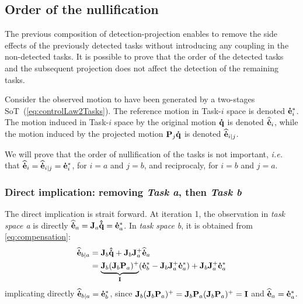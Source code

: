 \documentclass[letterpaper, 10pt, conference]{ieeeconf}      %
\begin{document}
%
%

\subsection{Order of the nullification}

The previous composition of detection-projection enables to remove the side effects of the previously detected tasks without introducing any coupling in the non-detected tasks. It is possible to prove that the order of the detected tasks and the subsequent projection does not affect the detection of the remaining tasks.

Consider the observed motion to have been generated by a two-stages
SoT~(\ref{eq:controlLaw2Tasks}). The reference motion in Task-$i$
space is denoted ${\mathbf{\dot{e}}}_{i}^*$. The motion induced in Task-$i$ space by the
original motion ${\mathbf{\dot{q}}}$ is denoted ${\mathbf{\widehat{\dot{e}}}}_{i}$, while the motion induced by
the projected motion ${\mathbf{P}}_{j} {\mathbf{\dot{q}}}$ is denoted ${\mathbf{\widehat{\dot{e}}}}_{i|j}$.

We will prove that the order of nullification of the tasks is not important,
\textit{i.e.} that ${\mathbf{\widehat{\dot{e}}}}_{i} = {\mathbf{\widehat{\dot{e}}}}_{i|j} = {\mathbf{\dot{e}}}_{i}^*$, for $i=a$ and $j=b$, and reciprocaly, for $i=b$ and $j=a$.

\subsubsection{Direct implication: removing \emph{Task a}, then \emph{Task b}}

The direct implication is strait forward.
%
At iteration 1, the observation in \emph{task space a} is directly
${\mathbf{\widehat{\dot{e}}}}_{a} = {\mathbf{J}}_a{\mathbf{\hat{\dot{q}}}} = {\mathbf{\dot{e}}}_{a}^*$.  In \emph{task space
  b}, it is obtained from \eqref{eq:compensation}:
\begin{align*}
 {\mathbf{\widehat{\dot{e}}}}_{b|a} &=  {\mathbf{J}}_b{\mathbf{\hat{\dot{q}}}} +  {\mathbf{J}}_b {\mathbf{J}}_a^+ {\mathbf{\widehat{\dot{e}}}}_{a}\\
 &= \underbrace{{\mathbf{J}}_b({\mathbf{J}}_b {\mathbf{P}}_a)^+}_{{\mathbf{I}}} ({\mathbf{\dot{e}}}_{b}^* - {\mathbf{J}}_b {\mathbf{J}}_a^+{\mathbf{\dot{e}}}_{a}^*) + {\mathbf{J}}_b {\mathbf{J}}_a^+ {\mathbf{\dot{e}}}_{a}^*
\end{align*}
implicating directly ${\mathbf{\widehat{\dot{e}}}}_{b|a}={\mathbf{\dot{e}}}_{b}^*$, since ${\mathbf{J}}_b({\mathbf{J}}_b {\mathbf{P}}_a)^+ = {\mathbf{J}}_b {\mathbf{P}}_a({\mathbf{J}}_b {\mathbf{P}}_a)^+ = {\mathbf{I}}$ and ${\mathbf{\widehat{\dot{e}}}}_{a} = {\mathbf{\dot{e}}}_{a}^*$.
\end{document}
